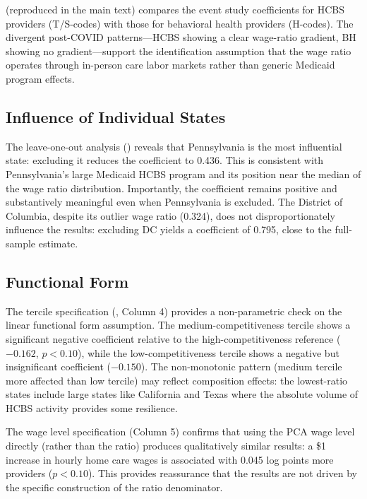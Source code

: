 \documentclass[12pt]{article}
\begin{document}
 (reproduced in the main text) compares the event study coefficients for HCBS providers (T/S-codes) with those for behavioral health providers (H-codes). The divergent post-COVID patterns---HCBS showing a clear wage-ratio gradient, BH showing no gradient---support the identification assumption that the wage ratio operates through in-person care labor markets rather than generic Medicaid program effects.

\subsection{Influence of Individual States}

The leave-one-out analysis () reveals that Pennsylvania is the most influential state: excluding it reduces the coefficient to 0.436. This is consistent with Pennsylvania's large Medicaid HCBS program and its position near the median of the wage ratio distribution. Importantly, the coefficient remains positive and substantively meaningful even when Pennsylvania is excluded. The District of Columbia, despite its outlier wage ratio (0.324), does not disproportionately influence the results: excluding DC yields a coefficient of 0.795, close to the full-sample estimate.

\subsection{Functional Form}

The tercile specification (, Column 4) provides a non-parametric check on the linear functional form assumption. The medium-competitiveness tercile shows a significant negative coefficient relative to the high-competitiveness reference ($-0.162$, $p < 0.10$), while the low-competitiveness tercile shows a negative but insignificant coefficient ($-0.150$). The non-monotonic pattern (medium tercile more affected than low tercile) may reflect composition effects: the lowest-ratio states include large states like California and Texas where the absolute volume of HCBS activity provides some resilience.

The wage level specification (Column 5) confirms that using the PCA wage level directly (rather than the ratio) produces qualitatively similar results: a \$1 increase in hourly home care wages is associated with 0.045 log points more providers ($p < 0.10$). This provides reassurance that the results are not driven by the specific construction of the ratio denominator.
\end{document}
